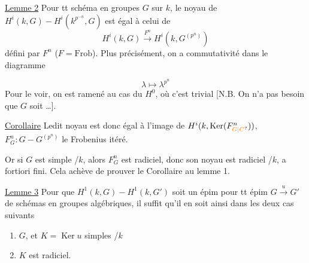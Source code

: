 \uline{Lemme 2} Pour tt schéma en groupes $G$ sur $k$, le noyau de $H^i(k,G)-H^i(k^{p^{-n}},G)$ est égal à celui de
\[
H^i(k,G)\xrightarrow{F^n}H^i(k,G^{(p^n)})
\]
défini par $F^n$ ($F=\mathrm{Frob}$). Plus précisément, on a commutativité dans le diagramme

\deleted{[N.B.}
\[
\lambda\longmapsto\lambda^{p^n}
\]
Pour le voir, on est ramené au cas du $H^0$, où c'est trivial [N.B. On n'a pas besoin que $G$ soit \ldots].

\uline{Corollaire} Ledit noyau est donc égal à l'image de $H^i(k,\operatorname{Ker}(F_{\unsure{G|C}}^n))$, $F_G^n:G-G^{(p^n)}$ le Frobenius itéré.

Or si $G$ est simple /$k$, alors $F_G^n$ est radiciel, donc son noyau est radiciel /$k$, a fortiori fini. Cela achève de prouver le Corollaire au lemme 1.

\uline{Lemme 3} Pour que $H^1(k,G)-H^1(k,G')$ soit un épim pour tt épim $G\xrightarrow{u}G'$ de schémas en groupes algébriques, il suffit qu'il en soit ainsi dans les deux cas suivants

\begin{enumerate}[label=\alph*)]
\item $G$,  et $K=\operatorname{Ker}u$   simples /$k$
\item $K$ est radiciel.
\end{enumerate}

